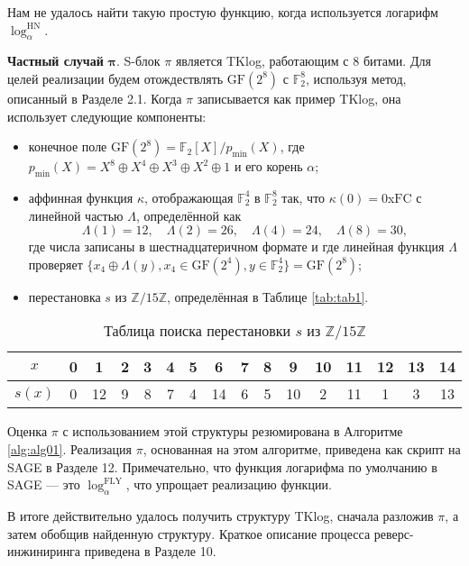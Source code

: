 Нам не удалось найти такую простую функцию, когда используется логарифм \(\log_{\alpha}^{\text{HN}}\).

\textbf{Частный случай} $\bm{\pi}$. S-блок \(\pi\) является TKlog, работающим с 8 битами. Для целей реализации будем отождествлять \(\text{GF}(2^8)\) с \(\mathbb{F}^8_2\), используя метод, описанный в Разделе 2.1. Когда \(\pi\) записывается как пример TKlog, она использует следующие компоненты:

\begin{itemize}
    \item конечное поле \(\text{GF}(2^8) = \mathbb{F}_2[X]/p_{\text{min}}(X)\), где \(p_{\text{min}}(X) = X^8 \oplus X^4 \oplus X^3 \oplus X^2 \oplus 1\) и его корень \(\alpha\);
    \item аффинная функция \(\kappa\), отображающая \(\mathbb{F}^4_2\) в \(\mathbb{F}^8_2\) так, что \(\kappa(0) = 0\)x\(\text{FC}\) с линейной частью \(\Lambda\), определённой как
    \[
    \Lambda(1) = 12, \quad \Lambda(2) = 26, \quad \Lambda(4) = 24, \quad \Lambda(8) = 30,
    \] где числа записаны в шестнадцатеричном формате и где линейная функция \(\Lambda\) проверяет \(\{x_4 \oplus \Lambda(y), x_4 \in \text{GF}(2^4), y \in \mathbb{F}^4_2\} = \text{GF}(2^8)\);
    \item перестановка \(s\) из \(\mathbb{Z}/15\mathbb{Z}\), определённая в Таблице \eqref{tab:tab1}.
\end{itemize}

\begin{table}    
  \caption{Таблица поиска перестановки \(s\) из \(\mathbb{Z}/15\mathbb{Z}\)}
  \begin{tabular}{cccccccccccccccc}
    \hline$x$ & 0 & 1 & 2 & 3 & 4 & 5 & 6 & 7 & 8 & 9 & 10 & 11 & 12 & 13 & 14 \\
    \hline$s(x)$ & 0 & 12 & 9 & 8 & 7 & 4 & 14 & 6 & 5 & 10 & 2 & 11 & 1 & 3 & 13 \\
    \hline
  \end{tabular}
  \label{tab:tab1}
\end{table}

Оценка \(\pi\) с использованием этой структуры резюмирована в Алгоритме \eqref{alg:alg01}. Реализация \(\pi\), основанная на этом алгоритме, приведена как скрипт на SAGE \cite{Dev17} в Разделе 12. Примечательно, что функция логарифма по умолчанию в SAGE — это \(\log_{\alpha}^{\text{FLY}}\), что упрощает реализацию функции.

В итоге действительно удалось получить структуру TKlog, сначала разложив \(\pi\), а затем обобщив найденную структуру. Краткое описание процесса реверс-инжиниринга приведена в Разделе 10.

